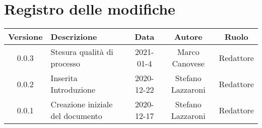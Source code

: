 \section*{Registro delle modifiche}

\begin{center}
	\begin{longtable}{|c|p{5cm}|c|c|c|}
	\hline
	\rowcolor{lighter-grayer}
	\textbf{Versione} & \textbf{Descrizione} & \textbf{Data} & \textbf{Autore} & \textbf{Ruolo} \\
	\hline
	\endfirsthead


	\hline
	0.0.3 & Stesura qualità di processo & 2021-01-4 & Marco Canovese & Redattore \\
	0.0.2 & Inserita Introduzione & 2020-12-22 & Stefano Lazzaroni & Redattore\\
    0.0.1 & Creazione iniziale del documento & 2020-12-17 & Stefano Lazzaroni & Redattore\\
	\hline

	\end{longtable}
\end{center}